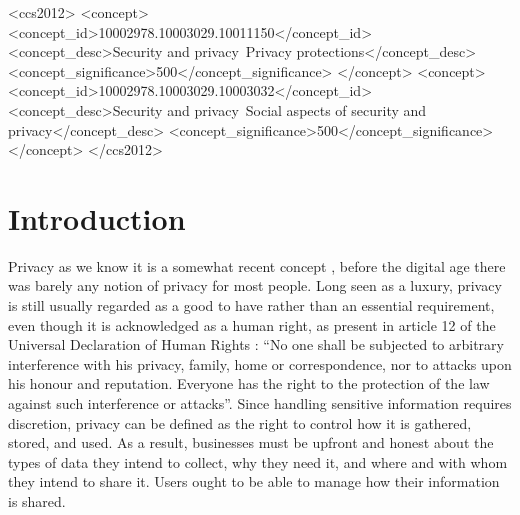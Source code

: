 \documentclass[manuscript,natbib=false]{acmart}
\begin{document}
\begin{CCSXML}
    <ccs2012>
        <concept>
            <concept_id>10002978.10003029.10011150</concept_id>
            <concept_desc>Security and privacy~Privacy protections</concept_desc>
            <concept_significance>500</concept_significance>
        </concept>
        <concept>
            <concept_id>10002978.10003029.10003032</concept_id>
            <concept_desc>Security and privacy~Social aspects of security and privacy</concept_desc>
            <concept_significance>500</concept_significance>
        </concept>
    </ccs2012>
\end{CCSXML}


\maketitle




\section{Introduction}

Privacy as we know it is a somewhat recent concept \cite{vincent2016privacy, moore2017privacy},
before the digital age there was barely any notion of privacy for most
people. Long seen as a luxury, privacy
is still usually regarded as a good to have rather than an essential
requirement, even though it is acknowledged as a human right, as present
in article 12 of the Universal Declaration of Human Rights \cite{RooseveltUniversal}:
``No one shall be subjected to arbitrary interference with his privacy,
family, home or correspondence, nor to attacks upon his honour and reputation.
Everyone has the right to the protection of the law against such interference
or attacks''. Since handling sensitive information requires discretion, privacy
can be defined \cite{InternationalWhat, SpiekermannEngineering}
as the right to control how it is gathered, stored, and used. As a result,
businesses must be upfront and honest about the types of data they intend to
collect, why they need it, and where and with whom they intend to share it.
Users ought to be able to manage how their information is shared.
\end{document}
